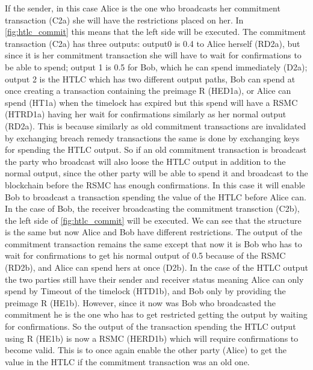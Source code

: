 If the sender, in this case Alice is the one who broadcasts her commitment transaction (C2a) she will have the restrictions placed on her.
In \cref{fig:htlc_commit} this means that the left side will be executed. The commitment transaction (C2a) has three outputs: output0 is 0.4 to Alice herself (RD2a), but since it is her commitment transaction she will have to wait for confirmations to be able to spend; output 1 is 0.5 for Bob, which he can spend immediately (D2a); output 2 is the HTLC which has two different output paths, Bob can spend at once creating a transaction containing the preimage R (HED1a), or Alice can spend (HT1a) when the timelock has expired but this spend will have a RSMC (HTRD1a) having her wait for confirmations similarly as her normal output (RD2a). This is because similarly as old commitment transactions are invalidated by exchanging breach remedy transactions the same is done by exchanging keys for spending the HTLC output. So if an old commitment transaction is broadcast the party who broadcast will also loose the HTLC output in addition to the normal output, since the other party will be able to spend it and broadcast to the blockchain before the RSMC has enough confirmations. In this case it will enable Bob to broadcast a transaction spending the value of the HTLC before Alice can.
In the case of Bob, the receiver broadcasting the commitment transction (C2b), the left side of \cref{fig:htlc_commit} will be executed. We can see that the structure is the same but now Alice and Bob have different restrictions. The output of the commitment transaction remains the same except that now it is Bob who has to wait for confirmations to get his normal output of 0.5 because of the RSMC (RD2b), and Alice can spend hers at once (D2b). In the case of the HTLC output the two parties still have their sender and receiver status meaning Alice can only spend by Timeout of the timelock (HTD1b), and Bob only by providing the preimage R (HE1b). However, since it now was Bob who broadcasted the commitment he is the one who has to get restricted getting the output by waiting for confirmations. So the output of the transaction spending the HTLC output using R (HE1b) is now a RSMC (HERD1b) which will require confirmations to become valid. This is to once again enable the other party (Alice) to get the value in the HTLC if the commitment transaction was an old one.  
\\ 


